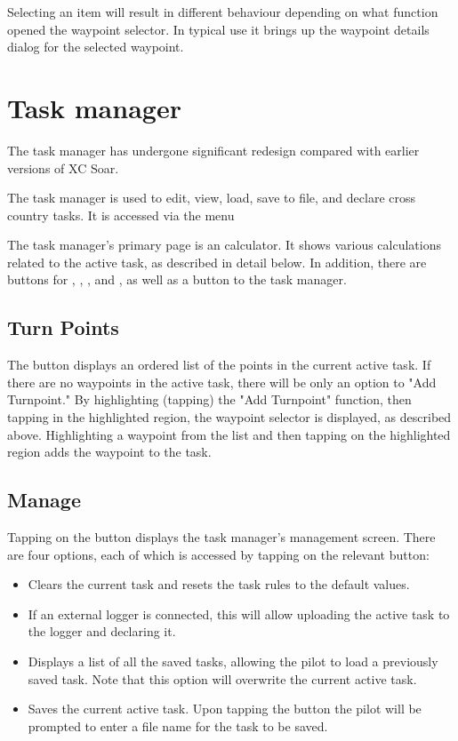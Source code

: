 Selecting an item will result in different behaviour
depending on what function opened the waypoint selector.  In typical
use it brings up the waypoint details dialog for the selected
waypoint.

\section{Task manager}\label{sec:task-manager-dialog}
\begin{it}The task manager has undergone significant redesign compared with earlier versions of XC Soar.\end{it}

The task manager is used to edit, view, load, save to file, and declare cross
country tasks. It is accessed via the menu
\begin{quote}
\blink{}
\end{quote} 

The task manager's primary page is an calculator. It shows various calculations related to the active task, as described in detail below.  In addition, there are buttons for , , , and , as well as a button to  the task manager.

\subsection*{Turn Points}
The  button displays an ordered list of the points in the current active task.  If there are no waypoints in the active task, there will be only an option to "Add Turnpoint."  By highlighting (tapping) the "Add Turnpoint" function, then tapping in the highlighted region, the waypoint selector is displayed, as described above.  Highlighting a waypoint from the list and then tapping on the highlighted region adds the waypoint to the task.

\subsection*{Manage}
Tapping on the  button displays the task manager's management screen.  There are four options, each of which is accessed by tapping on the relevant button:

\begin{itemize}
\item {} Clears the current task and resets the task rules to the default values.
\item {}  If an external logger is connected, this will allow uploading the  active task to the logger and declaring it.
\item {} Displays a list of all the saved tasks, allowing the pilot to load a previously saved task.  Note that this option will overwrite the current active task.
\item {}  Saves the current active task.  Upon tapping the  button the pilot will be prompted to enter a file name for the task to be saved.
\end{itemize}

